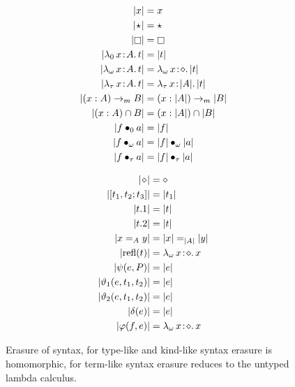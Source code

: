 

\begin{figure}
    \centering
    \begin{minipage}{0.5\textwidth}
        \begin{align*}
            |x| &= x \\
            |\!\star\!| &= \star \\
            |\kind| &= \kind \\
            |\abs{\lambda_0}{x}{A}{t}| &= |t| \\
            |\abs{\lambda_\omega}{x}{A}{t}| &= \abs{\lambda_\omega}{x}{\diamond}{|t|} \\
            |\abs{\lambda_\tau}{x}{A}{t}| &= \abs{\lambda_\tau}{x}{|A|}{|t|} \\
            |(x:A) \to_m B| &= (x:|A|) \to_m |B| \\
            |(x:A) \cap B| &= (x:|A|) \cap |B| \\
            |\app{f}{0}{a}| &= |f| \\
            |\app{f}{\omega}{a}| &= \app{|f|}{\omega}{|a|} \\
            |\app{f}{\tau}{a}| &= \app{|f|}{\tau}{|a|}
        \end{align*}
    \end{minipage}%
    \begin{minipage}{0.5\textwidth}
        \begin{align*}
            |\!\diamond\!| &= \diamond \\
            |[t_1, t_2; t_3]| &= |t_1| \\
            |t.1| &= |t| \\
            |t.2| &= |t| \\
            |x =_A y| &= |x| =_{|A|} |y| \\
            |\text{refl}(t)| &= {\lambda_\omega}\, x\! : \! \diamond.\, x \\
            |\psi(e, P)| &= |e| \\
            |\vartheta_1(e, t_1, t_2)| &= |e| \\
            |\vartheta_2(e, t_1, t_2)| &= |e| \\
            |\delta(e)| &= |e| \\
            |\varphi(f,e)| &= {\lambda_\omega}\, x\! : \! \diamond.\, x
        \end{align*}
    \end{minipage}
    \caption{Erasure of syntax, for type-like and kind-like syntax erasure is homomorphic, for term-like syntax erasure reduces to the untyped lambda calculus.}
\end{figure}
